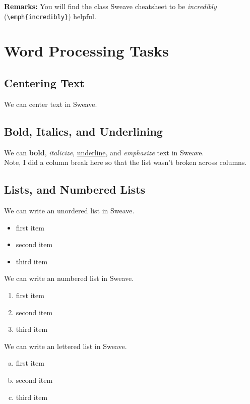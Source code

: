 \documentclass{article}\usepackage[]{graphicx}\usepackage[]{xcolor}
\begin{document}
\begin{multicols}{2}
\noindent \textbf{Remarks:} You will find the class Sweave cheatsheet to be \emph{incredibly} (\verb|\emph{incredibly}|) helpful.

\section{Word Processing Tasks}
\subsection{Centering Text}
\begin{center}
We can center text in Sweave.
\end{center}
\subsection{Bold, Italics, and Underlining}
\noindent We can \textbf{bold}, \textit{italicize}, \underline{underline}, and \emph{emphasize} text in Sweave. \\
\indent Note, I did a column break here so that the list wasn’t broken across columns.

\columnbreak

\subsection{Lists, and Numbered Lists}
We can write an unordered list in Sweave.
\begin{itemize}
  \item first item
  \item second item
  \item third item
\end{itemize}

\noindent We can write an numbered list in Sweave.
\begin{enumerate}
  \item first item
  \item second item
  \item third item
\end{enumerate}

\noindent We can write an lettered list in Sweave.
\begin{enumerate}[a.]
  \item first item
  \item second item
  \item third item
\end{enumerate}




\end{multicols}
\end{document}
